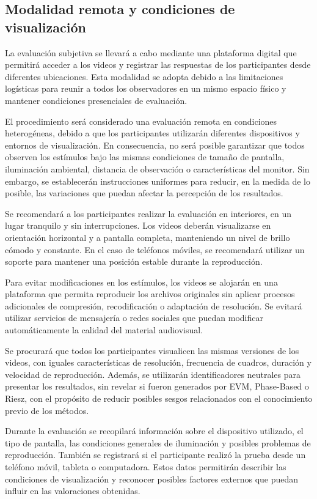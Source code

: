 \subsection{Modalidad remota y condiciones de visualización}

La evaluación subjetiva se llevará a cabo mediante una plataforma digital que permitirá acceder a los videos y registrar las respuestas de los participantes desde diferentes ubicaciones. Esta modalidad se adopta debido a las limitaciones logísticas para reunir a todos los observadores en un mismo espacio físico y mantener condiciones presenciales de evaluación.

El procedimiento será considerado una evaluación remota en condiciones heterogéneas, debido a que los participantes utilizarán diferentes dispositivos y entornos de visualización. En consecuencia, no será posible garantizar que todos observen los estímulos bajo las mismas condiciones de tamaño de pantalla, iluminación ambiental, distancia de observación o características del monitor. Sin embargo, se establecerán instrucciones uniformes para reducir, en la medida de lo posible, las variaciones que puedan afectar la percepción de los resultados.

Se recomendará a los participantes realizar la evaluación en interiores, en un lugar tranquilo y sin interrupciones. Los videos deberán visualizarse en orientación horizontal y a pantalla completa, manteniendo un nivel de brillo cómodo y constante. En el caso de teléfonos móviles, se recomendará utilizar un soporte para mantener una posición estable durante la reproducción.

Para evitar modificaciones en los estímulos, los videos se alojarán en una plataforma que permita reproducir los archivos originales sin aplicar procesos adicionales de compresión, recodificación o adaptación de resolución. Se evitará utilizar servicios de mensajería o redes sociales que puedan modificar automáticamente la calidad del material audiovisual.

Se procurará que todos los participantes visualicen las mismas versiones de los videos, con iguales características de resolución, frecuencia de cuadros, duración y velocidad de reproducción. Además, se utilizarán identificadores neutrales para presentar los resultados, sin revelar si fueron generados por EVM, Phase-Based o Riesz, con el propósito de reducir posibles sesgos relacionados con el conocimiento previo de los métodos.

Durante la evaluación se recopilará información sobre el dispositivo utilizado, el tipo de pantalla, las condiciones generales de iluminación y posibles problemas de reproducción. También se registrará si el participante realizó la prueba desde un teléfono móvil, tableta o computadora. Estos datos permitirán describir las condiciones de visualización y reconocer posibles factores externos que puedan influir en las valoraciones obtenidas.

